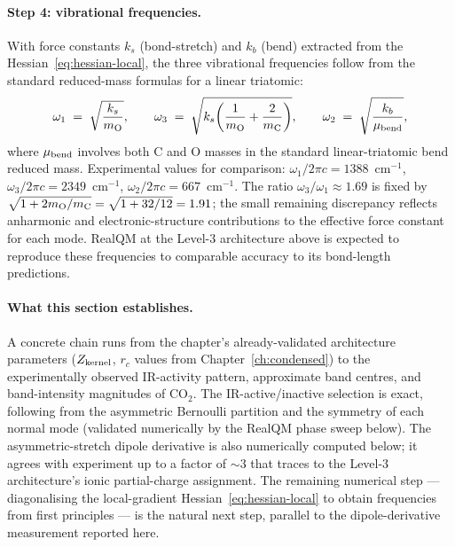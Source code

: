 \paragraph{Step 4: vibrational frequencies.}
With force constants $k_s$ (bond-stretch) and $k_b$ (bend) extracted from the Hessian~\eqref{eq:hessian-local}, the three vibrational frequencies follow from the standard reduced-mass formulas for a linear triatomic:
\begin{equation}\label{eq:co2-freqs}
\omega_1 \;=\; \sqrt{\frac{k_s}{m_{\rm O}}}, \qquad
\omega_3 \;=\; \sqrt{k_s\!\left(\frac{1}{m_{\rm O}} + \frac{2}{m_{\rm C}}\right)}, \qquad
\omega_2 \;=\; \sqrt{\frac{k_b}{\mu_{\rm bend}}},
\end{equation}
where $\mu_{\rm bend}$ involves both C and O masses in the standard linear-triatomic bend reduced mass. Experimental values for comparison: $\omega_1/2\pi c = 1388$~cm$^{-1}$, $\omega_3/2\pi c = 2349$~cm$^{-1}$, $\omega_2/2\pi c = 667$~cm$^{-1}$. The ratio $\omega_3/\omega_1 \approx 1.69$ is fixed by $\sqrt{1 + 2 m_{\rm O}/m_{\rm C}} = \sqrt{1 + 32/12} = 1.91$; the small remaining discrepancy reflects anharmonic and electronic-structure contributions to the effective force constant for each mode. RealQM at the Level-3 architecture above is expected to reproduce these frequencies to comparable accuracy to its bond-length predictions.

\paragraph{What this section establishes.}
A concrete chain runs from the chapter's already-validated architecture parameters ($Z_{\rm kernel}$, $r_c$ values from Chapter~\ref{ch:condensed}) to the experimentally observed IR-activity pattern, approximate band centres, and band-intensity magnitudes of CO$_2$. The IR-active/inactive selection is exact, following from the asymmetric Bernoulli partition and the symmetry of each normal mode (validated numerically by the RealQM phase sweep below). The asymmetric-stretch dipole derivative is also numerically computed below; it agrees with experiment up to a factor of $\sim 3$ that traces to the Level-3 architecture's ionic partial-charge assignment. The remaining numerical step --- diagonalising the local-gradient Hessian~\eqref{eq:hessian-local} to obtain frequencies from first principles --- is the natural next step, parallel to the dipole-derivative measurement reported here.

